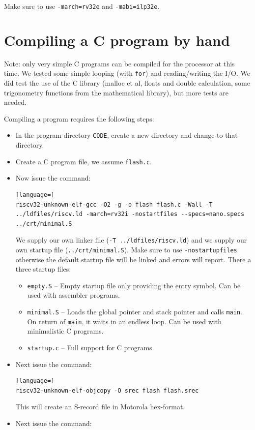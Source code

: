 \documentclass[12pt]{article}
\begin{document}
Make sure to use \texttt{-march=rv32e} and \texttt{-mabi=ilp32e}.


\section{Compiling a C program by hand}
Note: only very simple C programs can be compiled for the processor at this time. We tested some simple looping (with \texttt{for}) and reading/writing the I/O. We did test the use of the C library (malloc et al, floats and double calculation, some trigonometry  functions from the mathematical library), but more tests are needed.

Compiling a program requires the following steps:

\begin{itemize}
\item In the program directory \lstinline|CODE|, create a new directory and change to that directory.
\item Create a C program file, we assume \lstinline|flash.c|.
\item Now issue the command:
\begin{lstlisting}[language=]
riscv32-unknown-elf-gcc -O2 -g -o flash flash.c -Wall -T ../ldfiles/riscv.ld -march=rv32i -nostartfiles --specs=nano.specs ../crt/minimal.S
\end{lstlisting}
We supply our own linker file (\lstinline|-T ../ldfiles/riscv.ld|) and we supply our own startup file (\lstinline|../crt/minimal.S|). Make sure to use \lstinline|-nostartupfiles| otherwise the default startup file will be linked and errors will report. There a three startup files:
\begin{itemize}
\item \texttt{empty.S} -- Empty startup file only providing the entry symbol. Can be used with assembler programs.
\item \texttt{minimal.S} -- Loads the global pointer and stack pointer and calls \texttt{main}. On return of \texttt{main}, it waits in an endless loop. Can be used with minimalistic C programs.
\item \texttt{startup.c} -- Full support for C programs.
\end{itemize}
\item Next issue the command:
\begin{lstlisting}[language=]
riscv32-unknown-elf-objcopy -O srec flash flash.srec
\end{lstlisting}
This will create an S-record file in Motorola hex-format.
\item Next issue the command:

\end{itemize}
\end{document}
